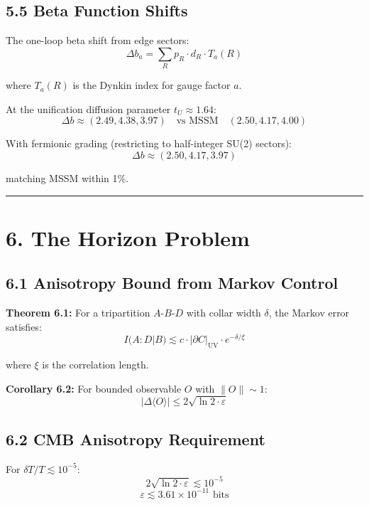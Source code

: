 \subsection{5.5 Beta Function Shifts}\label{55-beta-function-shifts}

The one-loop beta shift from edge sectors: \[\Delta b_a = \sum_R p_R \cdot d_R \cdot T_a(R)\]

where \(T_a(R)\) is the Dynkin index for gauge factor \(a\).

At the unification diffusion parameter \(t_U \approx 1.64\): \[\Delta b \approx (2.49, 4.38, 3.97) \quad \text{vs MSSM} \quad (2.50, 4.17, 4.00)\]

With fermionic grading (restricting to half-integer SU(2) sectors): \[\Delta b \approx (2.50, 4.17, 3.97)\]

matching MSSM within 1\%.

\begin{center}\rule{0.5\linewidth}{0.5pt}\end{center}

\section{6. The Horizon Problem}\label{6-the-horizon-problem}

\subsection{6.1 Anisotropy Bound from Markov Control}\label{61-anisotropy-bound-from-markov-control}

\textbf{Theorem 6.1:} For a tripartition \(A\)-\(B\)-\(D\) with collar width \(\delta\), the Markov error satisfies: \[I(A:D|B) \lesssim c \cdot |\partial C|_{\text{UV}} \cdot e^{-\delta/\xi}\]

where \(\xi\) is the correlation length.

\textbf{Corollary 6.2:} For bounded observable \(O\) with \(\|O\| \sim 1\): \[|\Delta\langle O \rangle| \leq 2\sqrt{\ln 2 \cdot \varepsilon}\]

\subsection{6.2 CMB Anisotropy Requirement}\label{62-cmb-anisotropy-requirement}

For \(\delta T/T \lesssim 10^{-5}\): \[2\sqrt{\ln 2 \cdot \varepsilon} \lesssim 10^{-5}\] \[\varepsilon \lesssim 3.61 \times 10^{-11} \text{ bits}\]

